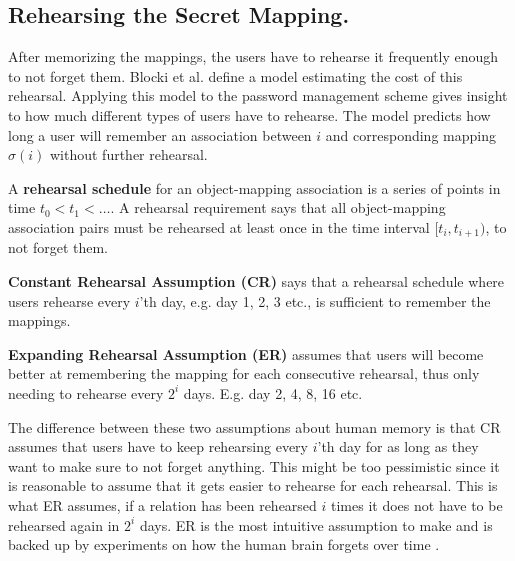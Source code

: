 \subsection{Rehearsing the Secret Mapping.}
After memorizing the mappings, the users have to rehearse it frequently enough to not forget them. Blocki et al. \cite{naturally-rehearsing} define a model estimating the cost of this rehearsal. Applying this model to the password management scheme gives insight to how much different types of users have to rehearse. The model predicts how long a user will remember an association between $i$ and corresponding mapping $\sigma(i)$ without further rehearsal.  

\begin{definition}
    \label{rehearsal-schedule}
A \textbf{ rehearsal schedule } for an object-mapping association is a series of points in time $t_0 < t_1 < \dots$. A rehearsal requirement says that all object-mapping association pairs must be rehearsed at least once in the time interval $[t_i, t_{i+1})$, to not forget them.
\end{definition}

\begin{requirement}\label{CR}
    \textbf{ Constant Rehearsal Assumption (CR)} says that a rehearsal schedule where users rehearse every $i$'th day, e.g. day 1, 2, 3 etc., is sufficient to remember the mappings.
\end{requirement}

\begin{requirement}\label{ER}
    \textbf{Expanding Rehearsal Assumption (ER)} assumes that users will become better at remembering the mapping for each consecutive rehearsal, thus only needing to rehearse every $2^i$ days. E.g. day 2, 4, 8, 16 etc.
\end{requirement}

The difference between these two assumptions about human memory is that CR assumes that users have to keep rehearsing every $i$'th day for as long as they want to make sure to not forget anything. This might be too pessimistic since it is reasonable to assume that it gets easier to rehearse for each rehearsal. This is what ER assumes, if a relation has been rehearsed $i$ times it does not have to be rehearsed again in $2^{i}$ days. ER is the most intuitive assumption to make and is backed up by experiments on how the human brain forgets over time \cite{forgetting, human-memory}.


